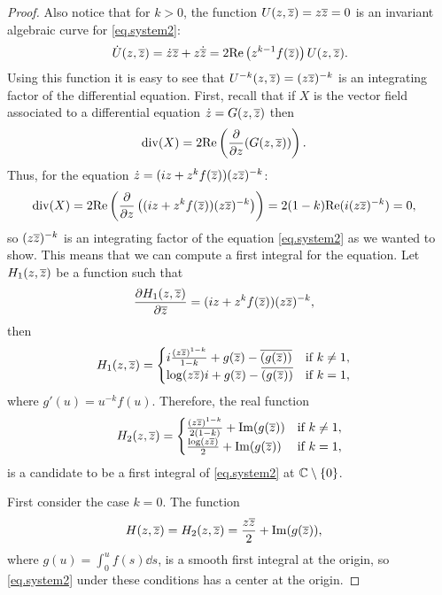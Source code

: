\begin{theorem}
\begin{proof}
Also notice that for $k>0$, the function $U(z,\overline{z})=z\overline{z}=0$ is an invariant algebraic curve for \eqref{eq.system2}:
\begin{align*}
\dot U(z,\overline{z})=\dot z\overline{z}+z\dot{\overline{z}}=2\mathrm{Re}\left(z^{k-1}f(\overline{z})\right)U(z,\overline{z}).
\end{align*}
Using this function it is easy to see that $U^{-k}(z,\overline{z})=(z\overline{z})^{-k}$ is an integrating factor of the differential equation. First, recall that if $X$ is the vector field associated to a differential equation $\dot z=G(z,\overline{z})$ then
\begin{align*}
\mathrm{div}(X) &= 2\mathrm{Re}\left(\frac{\partial{}}{\partial{z}}(G(z,\overline{z}))\right).
\end{align*}
Thus, for the equation $\dot z=(iz+z^kf(\overline{z}))(z\overline{z})^{-k}$:
\begin{align*}
\mathrm{div}(X) &= 2\mathrm{Re}\left(\frac{\partial{}}{\partial{z}}\left((iz+z^kf(\overline{z}))(z\overline{z})^{-k}\right)\right) = 2(1-k)\mathrm{Re}(i(z\overline{z})^{-k})=0,
\end{align*}
so $(z\overline{z})^{-k}$ is an integrating factor of the equation \eqref{eq.system2} as we wanted to show. This means that we can compute a first  integral for the equation. Let $H_1(z,\overline{z})$ be a function such that
\begin{align*}
\frac{\partial{H_1(z,\overline{z})}}{\partial{\overline{z}}}&=(iz+z^kf(\overline{z}))(z\overline{z})^{-k},
\end{align*}
then
\begin{align*}
H_1(z,\overline{z}) &= \begin{cases}
i\frac{(z\overline{z})^{1-k}}{1-k}+g(\overline{z})-\overline{(g(\overline{z}))}  & \textrm{if } k\ne1,\\
\log(z\overline{z})i+g(\overline{z})-\overline{(g(\overline{z}))} & \textrm{if } k=1,
\end{cases}
\end{align*}
where $g'(u)=u^{-k}f(u)$. Therefore, the real function
\begin{align*}
H_2(z,\overline{z})=\begin{cases}
\frac{(z\overline{z})^{1-k}}{2(1-k)}+\mathrm{Im}(g(\overline{z}))  & \textrm{if } k\ne1,\\
\frac{\log(z\overline{z})}{2}+\mathrm{Im}(g(\overline{z})) & \textrm{if } k=1,
\end{cases}
\end{align*}
is a candidate to be a first integral of \eqref{eq.system2} at $\mathbb{C}\setminus\{0\}$.

First consider the case $k=0$. The function
\begin{align*}
H(z,\overline{z})&=H_2(z,\overline{z})=\frac{z\overline{z}}{2}+\mathrm{Im}(g(\overline{z})),
\end{align*}
where $g(u)=\int_0^uf(s)\dd s$, is a smooth first integral at the origin, so \eqref{eq.system2} under these conditions has a center at the origin.


\end{proof}
\end{theorem}
